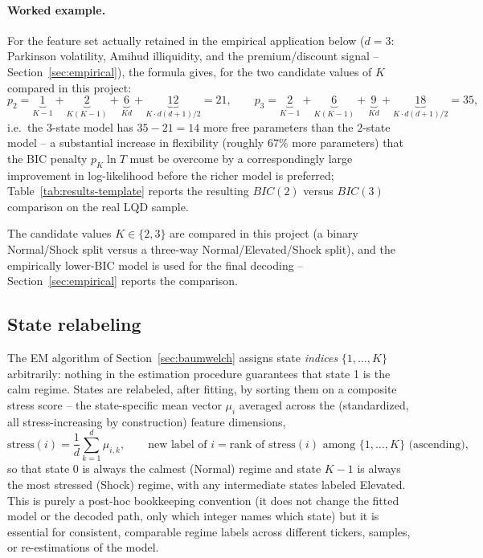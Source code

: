 \documentclass[11pt]{article}
\theoremstyle{definition}
\theoremstyle{remark}
\begin{document}
\paragraph{Worked example.} For the feature set actually retained in the empirical application below ($d=3$: Parkinson volatility, Amihud illiquidity, and the premium/discount signal -- Section~\ref{sec:empirical}), the formula gives, for the two candidate values of $K$ compared in this project:
\[
p_2 = \underbrace{1}_{K-1} + \underbrace{2}_{K(K-1)} + \underbrace{6}_{Kd} + \underbrace{12}_{K\cdot d(d+1)/2} = 21,
\qquad
p_3 = \underbrace{2}_{K-1} + \underbrace{6}_{K(K-1)} + \underbrace{9}_{Kd} + \underbrace{18}_{K\cdot d(d+1)/2} = 35,
\]
i.e.\ the $3$-state model has $35-21=14$ more free parameters than the $2$-state model -- a substantial increase in flexibility (roughly $67\%$ more parameters) that the BIC penalty $p_K\ln T$ must be overcome by a correspondingly large improvement in log-likelihood before the richer model is preferred; Table~\ref{tab:results-template} reports the resulting $BIC(2)$ versus $BIC(3)$ comparison on the real LQD sample.

The candidate values $K\in\{2,3\}$ are compared in this project (a binary Normal/Shock split versus a three-way Normal/Elevated/Shock split), and the empirically lower-BIC model is used for the final decoding -- Section~\ref{sec:empirical} reports the comparison.

\subsection{State relabeling}
\label{sec:relabel}

The EM algorithm of Section~\ref{sec:baumwelch} assigns state \emph{indices} $\{1,\dots,K\}$ arbitrarily: nothing in the estimation procedure guarantees that state 1 is the calm regime. States are relabeled, after fitting, by sorting them on a composite stress score -- the state-specific mean vector $\mu_i$ averaged across the (standardized, all stress-increasing by construction) feature dimensions,
\[
\text{stress}(i) = \frac1d\sum_{k=1}^d \mu_{i,k}, \qquad
\text{new label of } i = \text{rank of stress}(i)\text{ among }\{1,\dots,K\}\text{ (ascending)},
\]
so that state $0$ is always the calmest (Normal) regime and state $K-1$ is always the most stressed (Shock) regime, with any intermediate states labeled Elevated. This is purely a post-hoc bookkeeping convention (it does not change the fitted model or the decoded path, only which integer names which state) but it is essential for consistent, comparable regime labels across different tickers, samples, or re-estimations of the model.
\end{document}
